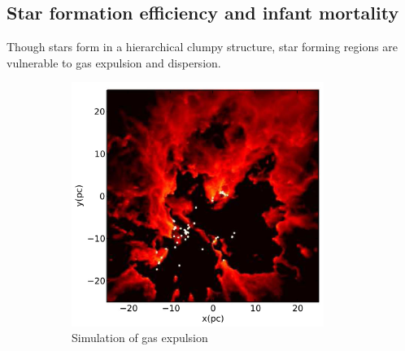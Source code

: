 \subsection{Star formation efficiency and infant mortality}

Though stars form in a hierarchical clumpy structure, star forming regions are vulnerable to gas expulsion and dispersion. 

\begin{figure}
\center
    \centering
    \begin{subfigure}[b]{0.48\textwidth}
        \includegraphics[width=0.9\textwidth]{Figures/0_ejectionwind.png}
        \caption{Simulation of gas expulsion}
        \label{Fig:0_ejection_1}
    \end{subfigure}
    \begin{subfigure}[b]{0.48\textwidth}


\end{subfigure}
\end{figure}
